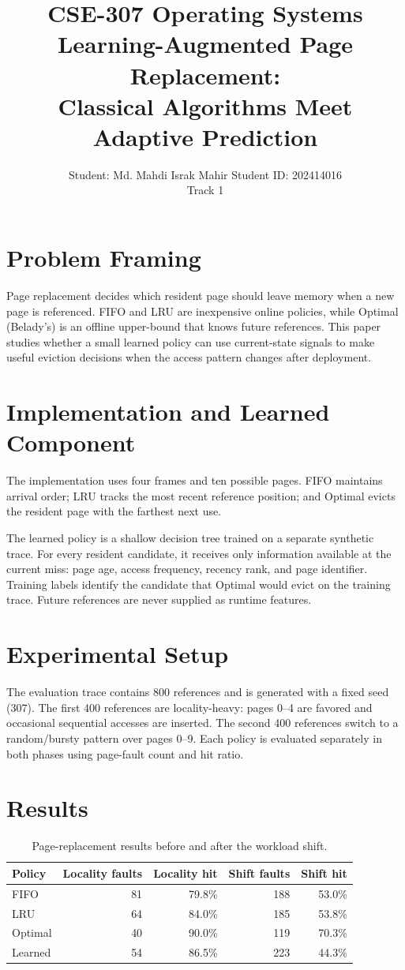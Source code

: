 \documentclass[11pt,letterpaper]{article}
\title{\textbf{CSE-307 Operating Systems}\\
Learning-Augmented Page Replacement:\\
Classical Algorithms Meet Adaptive Prediction}
\author{Student: Md. Mahdi Israk Mahir \quad Student ID: 202414016\\Track 1}
\date{}
\begin{document}
\maketitle
\thispagestyle{empty}

\section{Problem Framing}
Page replacement decides which resident page should leave memory when a new page is referenced. FIFO and LRU are inexpensive online policies, while Optimal (Belady's) is an offline upper-bound that knows future references. This paper studies whether a small learned policy can use current-state signals to make useful eviction decisions when the access pattern changes after deployment.

\section{Implementation and Learned Component}
The implementation uses four frames and ten possible pages. FIFO maintains arrival order; LRU tracks the most recent reference position; and Optimal evicts the resident page with the farthest next use.

The learned policy is a shallow decision tree trained on a separate synthetic trace. For every resident candidate, it receives only information available at the current miss: page age, access frequency, recency rank, and page identifier. Training labels identify the candidate that Optimal would evict on the training trace. Future references are never supplied as runtime features.

\section{Experimental Setup}
The evaluation trace contains 800 references and is generated with a fixed seed (307). The first 400 references are locality-heavy: pages 0--4 are favored and occasional sequential accesses are inserted. The second 400 references switch to a random/bursty pattern over pages 0--9. Each policy is evaluated separately in both phases using page-fault count and hit ratio.

\section{Results}

\begin{table}[h]
\centering
\caption{Page-replacement results before and after the workload shift.}
\begin{tabular}{lrrrr}
\toprule
\textbf{Policy} & \textbf{Locality faults} & \textbf{Locality hit} & \textbf{Shift faults} & \textbf{Shift hit}\\
\midrule
FIFO    & 81 & 79.8\% & 188 & 53.0\%\\
LRU     & 64 & 84.0\% & 185 & 53.8\%\\
Optimal  & 40 & 90.0\% & 119 & 70.3\%\\
Learned & 54 & 86.5\% & 223 & 44.3\%\\
\bottomrule
\end{tabular}
\end{table}
\end{document}
